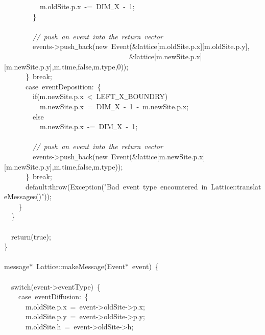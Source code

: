 {\ \ \ \ \ \ \ \ \ \ m.oldSite.p.x\ -{}=\ DIM\underline\ X\ -{}\ 1;\\
\ \ \ \ \ \ \ \ \}\\
\ \\
\ \ \ \ \ \ \ \ \textsl{//\ push\ an\ event\ into\ the\ return\ vector}\\
\ \ \ \ \ \ \ \ events-{}>{}push\underline\ back(new\ Event(\&lattice[m.oldSite.p.x][m.oldSite.p.y],\\
\ \ \ \ \ \ \ \ \ \ \ \ \ \ \ \ \ \ \ \ \ \ \ \ \ \ \ \ \ \ \ \ \ \ \ \&lattice[m.newSite.p.x][m.newSite.p.y],m.time,false,m.type,0));\\
\ \ \ \ \ \ \}\ break;\\
\ \ \ \ \ \ case\ eventDeposition:\ \{\\
\ \ \ \ \ \ \ \ if(m.newSite.p.x\ <{}\ LEFT\underline\ X\underline\ BOUNDRY)\\
\ \ \ \ \ \ \ \ \ \ m.newSite.p.x\ =\ DIM\underline\ X\ -{}\ 1\ -{}\ m.newSite.p.x;\\
\ \ \ \ \ \ \ \ else\\
\ \ \ \ \ \ \ \ \ \ m.newSite.p.x\ -{}=\ DIM\underline\ X\ -{}\ 1;\\
\ \\
\ \ \ \ \ \ \ \ \textsl{//\ push\ an\ event\ into\ the\ return\ vector}\\
\ \ \ \ \ \ \ \ events-{}>{}push\underline\ back(new\ Event(\&lattice[m.newSite.p.x][m.newSite.p.y],m.time,false,m.type));\\
\ \ \ \ \ \ \}\ break;\\
\ \ \ \ \ \ default:throw(Exception("{}Bad\ event\ type\ encountered\ in\ Lattice::translateMessages()"{}));\\
\ \ \ \ \}\\
\ \ \}\\
\ \\
\ \ return(true);\\
\}\\
\ \\
message$\ast$\ Lattice::makeMessage(Event$\ast$\ event)\ \{\\
\ \\
\ \ switch(event-{}>{}eventType)\ \{\\
\ \ \ \ case\ eventDiffusion:\ \{\\
\ \ \ \ \ \ m.oldSite.p.x\ =\ event-{}>{}oldSite-{}>{}p.x;\\
\ \ \ \ \ \ m.oldSite.p.y\ =\ event-{}>{}oldSite-{}>{}p.y;\\
\ \ \ \ \ \ m.oldSite.h\ =\ event-{}>{}oldSite-{}>{}h;\\
}
